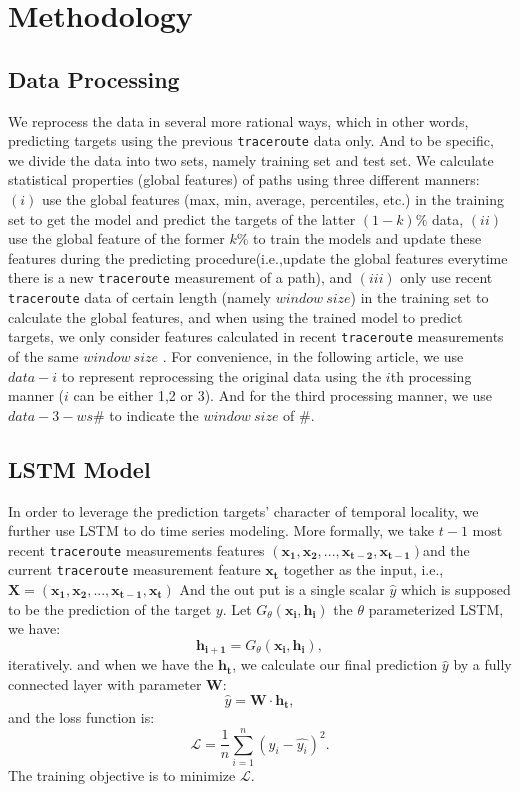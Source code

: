 \documentclass[sigconf]{acmart}
\begin{document}
	\section{Methodology}
	\subsection{Data Processing}
	We reprocess the data in several more rational ways, which in other words, predicting targets using the previous \texttt{traceroute} data only. And to be specific, we divide the data into two sets, namely training set and test set. We calculate statistical properties (global features) of paths using three different manners: $(i)$ use the global features (max, min, average, percentiles, etc.) in the training set to get the model and predict the targets of the latter $(1-k)\%$ data, $(ii)$ use the global feature of the former $k\%$ to train the models and update these features during the predicting procedure(i.e.,update the global features everytime there is a new \texttt{traceroute} measurement of a path), and $(iii)$ only use recent \texttt{traceroute} data of certain length (namely $window\ size$) in the training set to calculate the global features, and when using the trained model to predict targets, we only consider features calculated in  recent \texttt{traceroute} measurements of the same $window\ size$ . For convenience, in the following article, we use $data-i$ to represent reprocessing the original data using the $i$th processing manner ($i$ can be either 1,2 or 3). And for the third processing manner, we use $data-3-ws\#$ to indicate the $window\ size$ of $\#$.
	
	\subsection{LSTM Model}
	In order to leverage the prediction targets' character of temporal locality, we further use LSTM to do time series modeling. More formally, we take $t-1$ most recent \texttt{traceroute} measurements features $(\mathbf{x_1},\mathbf{x_2},...,\mathbf{x_{t-2}},\mathbf{x_{t-1}})$and the current \texttt{traceroute} measurement feature $\mathbf{x_t}$ together as the input, i.e., $\mathbf{X}=(\mathbf{x_1}, \mathbf{x_2},...,\mathbf{x_{t-1}}, \mathbf{x_{t}})$ And the out put is a single scalar $\hat{y}$ which is supposed to be the prediction of the target $y$.
	Let $G_{\theta}(\mathbf{x_i},\mathbf{h_i})$ the $\theta$ parameterized LSTM, we have:
	\begin{equation}
	\mathbf{h_{i+1}}=G_{\theta}(\mathbf{x_i},\mathbf{h_i}),
	\end{equation}iteratively. and when we have the $\mathbf{h_{t}}$, we calculate our final prediction $\hat{y}$ by a fully connected layer with parameter $\mathbf{W}$:
	\begin{equation}
	\hat{y}=\mathbf{W}\cdot\mathbf{h_t},
	\end{equation}
	and the loss function is:
	\begin{equation}
	\mathcal{L}=\frac{1}{n}\sum_{i=1}^{n}(y_i-\hat{y_i})^2.
	\end{equation}
	The training objective is to minimize $\mathcal{L}$.
	
\end{document}
